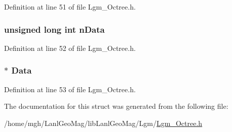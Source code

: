 Definition at line 51 of file Lgm\_\-Octree.h.\hypertarget{struct___lgm___octree_cell_c6f35f845cda4fa90dc63051fc4f061a}{
\subsubsection[{nData}]{\setlength{\rightskip}{0pt plus 5cm}unsigned long int {\bf nData}}}
\label{struct___lgm___octree_cell_c6f35f845cda4fa90dc63051fc4f061a}




Definition at line 52 of file Lgm\_\-Octree.h.\hypertarget{struct___lgm___octree_cell_173e4af4e76fa34ce187cdf4c913e9d3}{
\subsubsection[{Data}]{$\ast$ {\bf Data}}}
\label{struct___lgm___octree_cell_173e4af4e76fa34ce187cdf4c913e9d3}




Definition at line 53 of file Lgm\_\-Octree.h.

The documentation for this struct was generated from the following file:\begin{CompactItemize}
\item 
/home/mgh/LanlGeoMag/libLanlGeoMag/Lgm/\hyperlink{_lgm___octree_8h}{Lgm\_\-Octree.h}\end{CompactItemize}
